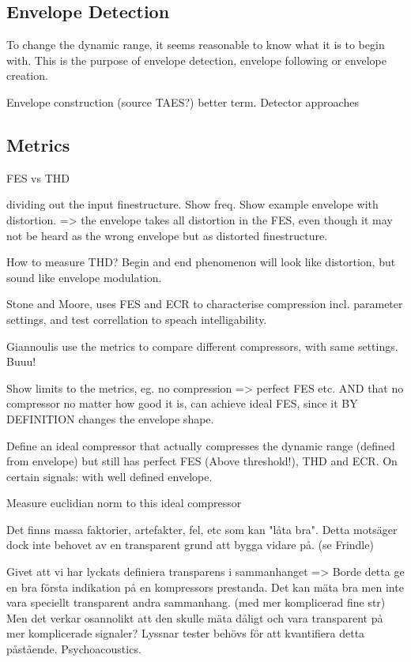 \documentclass[../main2.tex]{subfiles}
\begin{document}
\subsection{Envelope Detection}
To change the dynamic range, it seems reasonable to know what it is to begin with. This is the purpose of envelope detection, envelope following or envelope creation.

Envelope construction (source TAES?) better term.
Detector approaches

\subsection{Metrics}
FES vs THD

dividing out the input finestructure. Show freq. Show example envelope with distortion. => the envelope takes all distortion in the FES, even though it may not be heard as the wrong envelope but as distorted finestructure.

How to measure THD? Begin and end phenomenon will look like distortion, but sound like envelope modulation.


Stone and Moore, uses FES and ECR to characterise compression incl. parameter settings, and test correllation to speach intelligability.

Giannoulis use the metrics to compare different compressors, with same settings. Buuu!

Show limits to the metrics, eg. no compression => perfect FES etc.
AND that no compressor no matter how good it is, can achieve ideal FES, since it BY DEFINITION changes the envelope shape.

Define an ideal compressor that actually compresses the dynamic range (defined from envelope) but still has perfect FES (Above threshold!), THD and ECR.
On certain signals: with well defined envelope. 

Measure euclidian norm to this ideal compressor




Det finns massa faktorier, artefakter, fel, etc som kan "låta bra". Detta motsäger dock inte behovet av en transparent grund att bygga vidare på. (se Frindle)

Givet att vi har lyckats definiera transparens i sammanhanget => Borde detta ge en bra första indikation på en kompressors prestanda.
Det kan mäta bra men inte vara speciellt transparent andra sammanhang. (med mer komplicerad fine str) Men det verkar osannolikt att den skulle mäta dåligt och vara transparent på mer komplicerade signaler? Lyssnar tester behövs för att kvantifiera detta påstående. Psychoacoustics.
\end{document}
